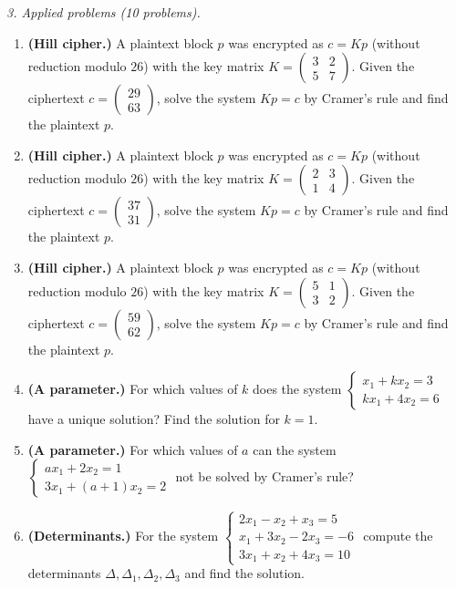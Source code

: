 \emph{3. Applied problems (10 problems).}
\bigskip
\begin{enumerate}[label=\arabic*., leftmargin=*]
\item \textbf{(Hill cipher.)} A plaintext block $p$ was encrypted as $c=Kp$ (without reduction modulo $26$) with the key matrix $K=\begin{pmatrix}3 & 2\\ 5 & 7\end{pmatrix}$. Given the ciphertext $c=\begin{pmatrix}29\\ 63\end{pmatrix}$, solve the system $Kp=c$ by Cramer’s rule and find the plaintext $p$.
\item \textbf{(Hill cipher.)} A plaintext block $p$ was encrypted as $c=Kp$ (without reduction modulo $26$) with the key matrix $K=\begin{pmatrix}2 & 3\\ 1 & 4\end{pmatrix}$. Given the ciphertext $c=\begin{pmatrix}37\\ 31\end{pmatrix}$, solve the system $Kp=c$ by Cramer’s rule and find the plaintext $p$.
\item \textbf{(Hill cipher.)} A plaintext block $p$ was encrypted as $c=Kp$ (without reduction modulo $26$) with the key matrix $K=\begin{pmatrix}5 & 1\\ 3 & 2\end{pmatrix}$. Given the ciphertext $c=\begin{pmatrix}59\\ 62\end{pmatrix}$, solve the system $Kp=c$ by Cramer’s rule and find the plaintext $p$.
\item \textbf{(A parameter.)} For which values of $k$ does the system $\begin{cases}x_1+kx_2=3\\kx_1+4x_2=6\end{cases}$ have a unique solution? Find the solution for $k=1$.
\item \textbf{(A parameter.)} For which values of $a$ can the system $\begin{cases}ax_1+2x_2=1\\3x_1+(a+1)x_2=2\end{cases}$ not be solved by Cramer’s rule?
\item \textbf{(Determinants.)} For the system $\begin{cases}2x_1-x_2+x_3=5\\x_1+3x_2-2x_3=-6\\3x_1+x_2+4x_3=10\end{cases}$ compute the determinants $\Delta,\Delta_1,\Delta_2,\Delta_3$ and find the solution.

\end{enumerate}
